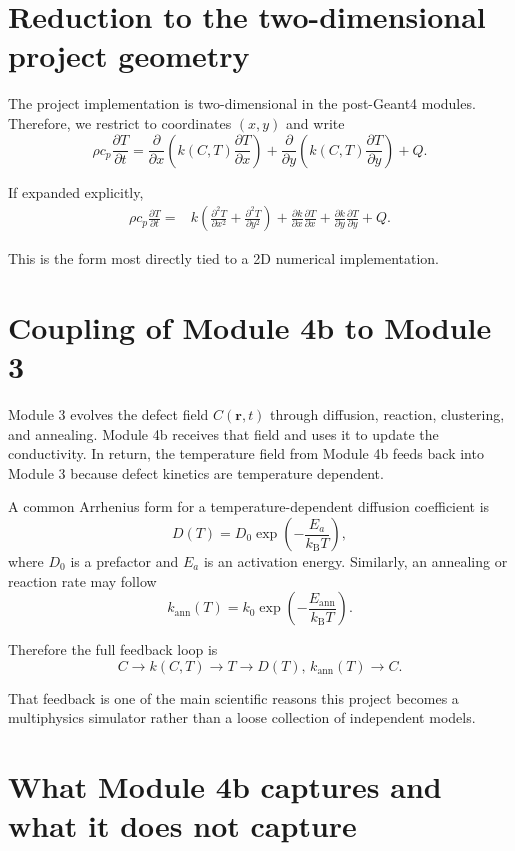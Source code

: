 \documentclass[11pt]{article}
\newcommand{\kB}{k_{\mathrm{B}}}
\newcommand{\rvec}{\mathbf{r}}
\begin{document}
\section{Reduction to the two-dimensional project geometry}

The project implementation is two-dimensional in the post-Geant4 modules. Therefore, we restrict to coordinates $(x,y)$ and write
\[
\rho c_p \frac{\partial T}{\partial t} = \frac{\partial}{\partial x}\left(k(C,T)\frac{\partial T}{\partial x}\right) + \frac{\partial}{\partial y}\left(k(C,T)\frac{\partial T}{\partial y}\right) + Q.
\]

If expanded explicitly,
\begin{align*}
\rho c_p \frac{\partial T}{\partial t} = {} & k\left(\frac{\partial^2 T}{\partial x^2}+\frac{\partial^2 T}{\partial y^2}\right)
+ \frac{\partial k}{\partial x}\frac{\partial T}{\partial x}
+ \frac{\partial k}{\partial y}\frac{\partial T}{\partial y}
+ Q.
\end{align*}

This is the form most directly tied to a 2D numerical implementation.

\section{Coupling of Module 4b to Module 3}

Module 3 evolves the defect field $C(\rvec,t)$ through diffusion, reaction, clustering, and annealing. Module 4b receives that field and uses it to update the conductivity. In return, the temperature field from Module 4b feeds back into Module 3 because defect kinetics are temperature dependent.

A common Arrhenius form for a temperature-dependent diffusion coefficient is
\[
 D(T) = D_0 \exp\left(-\frac{E_a}{\kB T}\right),
\]
where $D_0$ is a prefactor and $E_a$ is an activation energy. Similarly, an annealing or reaction rate may follow
\[
 k_{\mathrm{ann}}(T) = k_0 \exp\left(-\frac{E_{\mathrm{ann}}}{\kB T}\right).
\]

Therefore the full feedback loop is
\[
 C \longrightarrow k(C,T) \longrightarrow T \longrightarrow D(T),\, k_{\mathrm{ann}}(T) \longrightarrow C.
\]

That feedback is one of the main scientific reasons this project becomes a multiphysics simulator rather than a loose collection of independent models.

\section{What Module 4b captures and what it does not capture}
\end{document}
